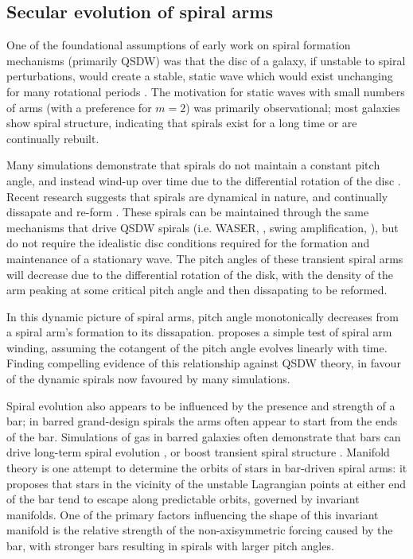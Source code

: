 \subsection{Secular evolution of spiral arms}


One of the foundational assumptions of early work on spiral formation mechanisms (primarily QSDW) was that the disc of a galaxy, if unstable to spiral perturbations, would create a stable, static wave which would exist unchanging for many rotational periods \citep{1964ApJ...140..646L}. The motivation for static waves with small numbers of arms (with a preference for $m=2$) was primarily observational; most galaxies show spiral structure, indicating that spirals exist for a long time or are continually rebuilt.

Many simulations demonstrate that spirals do not maintain a constant pitch angle, and instead wind-up over time due to the differential rotation of the disc \citep{2013ApJ...763...46B}. Recent research suggests that spirals are dynamical in nature, and continually dissapate and re-form \citep{2014PASA...31...35D}. These spirals can be maintained through the same mechanisms that drive QSDW spirals (i.e. WASER, \citealt{1976ApJ...205..363M}, swing amplification, \citealt{1965MNRAS.130..125G}), but do not require the idealistic disc conditions required for the formation and maintenance of a stationary wave. The pitch angles of these transient spiral arms will decrease due to the differential rotation of the disk, with the density of the arm peaking at some critical pitch angle and then dissapating to be reformed.

In this dynamic picture of spiral arms, pitch angle monotonically decreases from a spiral arm's formation to its dissapation. \citet{2019arXiv190910291P} proposes a simple test of spiral arm winding, assuming the cotangent of the pitch angle evolves linearly with time. Finding compelling evidence of this relationship against QSDW theory, in favour of the dynamic spirals now favoured by many simulations.

Spiral evolution also appears to be influenced by the presence and strength of a bar; in barred grand-design spirals the arms often appear to start from the ends of the bar. Simulations of gas in barred galaxies often demonstrate that bars can drive long-term spiral evolution \citep{2008A&A...489..115R}, or boost transient spiral structure \citep{2012MNRAS.426..167G}. Manifold theory is one attempt to determine the orbits of stars in bar-driven spiral arms: it proposes that stars in the vicinity of the unstable Lagrangian points at either end of the bar tend to escape along predictable orbits, governed by invariant manifolds. One of the primary factors influencing the shape of this invariant manifold is the relative strength of the non-axisymmetric forcing caused by the bar, with stronger bars resulting in spirals with larger pitch angles.


